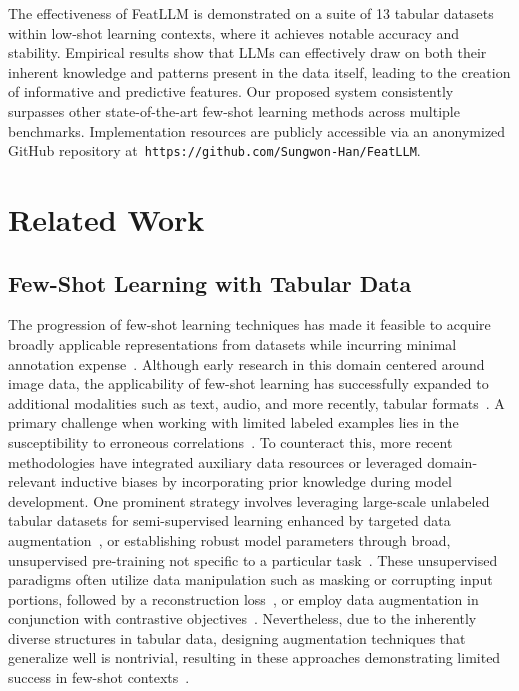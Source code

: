 The effectiveness of \textsf{FeatLLM} is demonstrated on a suite of 13 tabular datasets within low-shot learning contexts, where it achieves notable accuracy and stability. Empirical results show that LLMs can effectively draw on both their inherent knowledge and patterns present in the data itself, leading to the creation of informative and predictive features. Our proposed system consistently surpasses other state-of-the-art few-shot learning methods across multiple benchmarks. Implementation resources are publicly accessible via an anonymized GitHub repository at~\texttt{https://github.com/Sungwon-Han/FeatLLM}.

\section{Related Work}

\subsection{Few-Shot Learning with Tabular Data} The progression of few-shot learning techniques has made it feasible to acquire broadly applicable representations from datasets while incurring minimal annotation expense~\cite{chen2018closer}. Although early research in this domain centered around image data, the applicability of few-shot learning has successfully expanded to additional modalities such as text, audio, and more recently, tabular formats~\cite{majumder2022few,nam2023stunt,schick2021exploiting}. A primary challenge when working with limited labeled examples lies in the susceptibility to erroneous correlations~\cite{bartlett2021deep}. To counteract this, more recent methodologies have integrated auxiliary data resources or leveraged domain-relevant inductive biases by incorporating prior knowledge during model development. One prominent strategy involves leveraging large-scale unlabeled tabular datasets for semi-supervised learning enhanced by targeted data augmentation~\cite{ucar2021subtab,yoon2020vime}, or establishing robust model parameters through broad, unsupervised pre-training not specific to a particular task~\cite{somepalli2021saint}. These unsupervised paradigms often utilize data manipulation such as masking or corrupting input portions, followed by a reconstruction loss~\cite{arik2021tabnet,majmundar2022met}, or employ data augmentation in conjunction with contrastive objectives~\cite{bahri2022scarf,chen2020simple}. Nevertheless, due to the inherently diverse structures in tabular data, designing augmentation techniques that generalize well is nontrivial, resulting in these approaches demonstrating limited success in few-shot contexts~\cite{nam2023stunt}. 


